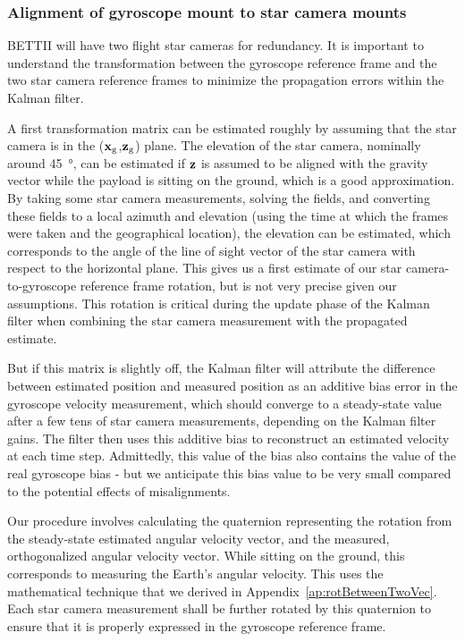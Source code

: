 \subsubsection{Alignment of gyroscope mount to star camera mounts}

BETTII will have two flight star cameras for redundancy. It is important to understand the transformation between the gyroscope reference frame and the two star camera reference frames to minimize the propagation errors within the Kalman filter. 

A first transformation matrix can be estimated roughly by assuming that the star camera is in the ($\textrm{\textbf{x}}_{\textrm{g}}$,$\textrm{\textbf{z}}_{\textrm{g}}$) plane. The elevation of the star camera, nominally around \SI{45}{\degree}, can be estimated if $\textrm{\textbf{z}}$ is assumed to be aligned with the gravity vector while the payload is sitting on the ground, which is a good approximation. By taking some star camera measurements, solving the fields, and converting these fields to a local azimuth and elevation (using the time at which the frames were taken and the geographical location), the elevation can be estimated, which corresponds to the angle of the line of sight vector of the star camera with respect to the horizontal plane. This gives us a first estimate of our star camera-to-gyroscope reference frame rotation, but is not very precise given our assumptions. This rotation is critical during the update phase of the Kalman filter when combining the star camera measurement with the propagated estimate.

But if this matrix is slightly off, the Kalman filter will attribute the difference between estimated position and measured position as an additive bias error in the gyroscope velocity measurement, which should converge to a steady-state value after a few tens of star camera measurements, depending on the Kalman filter gains. The filter then uses this additive bias to reconstruct an estimated velocity at each time step. Admittedly, this value of the bias also contains the value of the real gyroscope bias - but we anticipate  this bias value to be very small compared to the potential effects of misalignments.

Our procedure involves calculating the quaternion representing the rotation from the steady-state estimated angular velocity vector, and the measured, orthogonalized angular velocity vector. While sitting on the ground, this corresponds to measuring the Earth's angular velocity. This uses the mathematical technique that we derived in Appendix~\ref{ap:rotBetweenTwoVec}. Each star camera measurement shall be further rotated by this quaternion to ensure that it is properly expressed in the gyroscope reference frame. 

